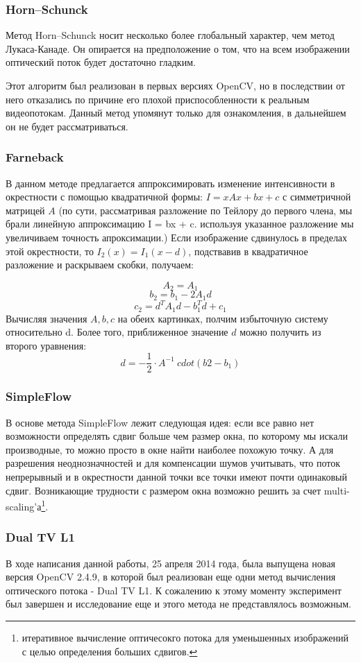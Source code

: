 \subsubsection{Horn–Schunck}
Метод Horn–Schunck носит несколько более глобальный характер, чем метод Лукаса-Канаде. Он опирается на предположение о том, что на всем изображении оптический поток будет достаточно гладким.

Этот алгоритм был реализован в первых версиях OpenCV, но в последствии от него отказались по причине его плохой приспособленности к реальным видеопотокам. Данный метод упомянут только для ознакомления, в дальнейшем он не будет рассматриваться. 

\subsubsection{Farneback}
В данном методе предлагается аппроксимировать изменение интенсивности в окрестности с помощью квадратичной формы: $I = xAx + bx + c$ с симметричной матрицей $A$ (по сути, рассматривая разложение по Тейлору до первого члена, мы брали линейную аппроксимацию I = bx + c. используя указанное разложение мы увеличиваем точность апроксимации.)
Если изображение сдвинулось в пределах этой окрестности, то 
$I_2 (x) = I_1 (x-d)$, подствавив в квадратичное разложение и раскрываем скобки, получаем:

$$ A_2 = A_1 $$
$$ b_2 = b_1 - 2A_1d $$
$$ c_2 = d^TA_1d - b_1^Td + c_1 $$
Вычисляя значения $A, b, c$ на обеих картинках, полчим избыточную систему относительно d. Более того, приближенное значение $d$ можно получить из второго уравнения: 
$$ d = -\frac{1}{2} \cdot A^{-1} \ cdot (b2 - b_1) $$

\subsubsection{SimpleFlow}
В основе метода SimpleFlow лежит следующая идея: если все равно нет возможности определять сдвиг больше чем размер окна, по которому мы искали производные, то можно просто в окне найти наиболее похожую точку. А для разрешения неоднозначностей и для компенсации шумов учитывать, что поток непрерывный и в окрестности данной точки все точки имеют почти одинаковый сдвиг. Возникающие трудности с размером окна возможно решить за счет multi-scaling'а\footnote{итеративное вычисление оптичесокго потока для уменьшенных изображений с целью определения больших сдвигов.}.

\subsubsection{Dual TV L1}
В ходе написания данной работы, 25 апреля 2014 года, была выпущена новая версия OpenCV 2.4.9, в которой был реализован еще одни метод вычисления оптического потока - Dual TV L1. 
К сожалению к этому моменту эксперимент был завершен и исследование еще и этого метода не представлялось возможным. 

